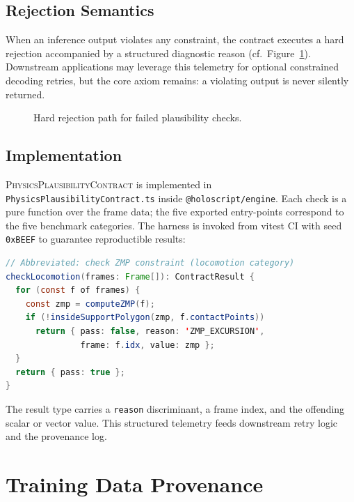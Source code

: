 \documentclass[sigconf,nonacm]{acmart}
\newcommand{\plausibility}{\textsc{PhysicsPlausibilityContract}}
\begin{document}
\subsection{Rejection Semantics}
When an inference output violates any constraint, the contract executes a hard rejection accompanied by a structured diagnostic reason (cf.\ Figure~\ref{fig:reject}). Downstream applications may leverage this telemetry for optional constrained decoding retries, but the core axiom remains: a violating output is never silently returned. %

\begin{figure}[t]
  \centering
  \caption{Hard rejection path for failed plausibility checks.}
  \label{fig:reject}
\end{figure}

\subsection{Implementation}
\label{sec:contract:impl}

\plausibility{} is implemented in
\texttt{PhysicsPlausibilityContract.ts} inside
\texttt{@holoscript/engine}. Each check is a pure function over the
frame data; the five exported entry-points correspond to the five
benchmark categories. The harness is invoked from vitest CI with
seed \texttt{0xBEEF} to guarantee reproductible results:

\begin{lstlisting}[language=Java,basicstyle=\ttfamily\small,
  frame=single,xleftmargin=6pt,xrightmargin=6pt]
// Abbreviated: check ZMP constraint (locomotion category)
checkLocomotion(frames: Frame[]): ContractResult {
  for (const f of frames) {
    const zmp = computeZMP(f);
    if (!insideSupportPolygon(zmp, f.contactPoints))
      return { pass: false, reason: 'ZMP_EXCURSION',
               frame: f.idx, value: zmp };
  }
  return { pass: true };
}
\end{lstlisting}

The result type carries a \texttt{reason} discriminant, a frame index,
and the offending scalar or vector value. This structured telemetry
feeds downstream retry logic and the provenance log.

\section{Training Data Provenance}
\label{sec:training}
\end{document}
